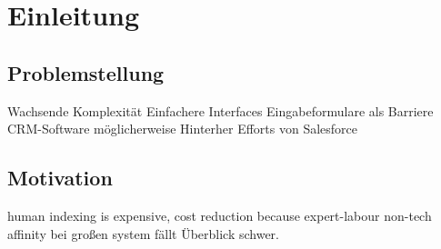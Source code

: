 \chapter{Einleitung}
\section{Problemstellung}
Wachsende Komplexität
Einfachere Interfaces
Eingabeformulare als Barriere
CRM-Software möglicherweise Hinterher
Efforts von Salesforce

\section{Motivation}
human indexing is expensive, cost reduction because expert-labour \cite{shneiderman}
non-tech affinity 
bei großen system fällt Überblick schwer.
